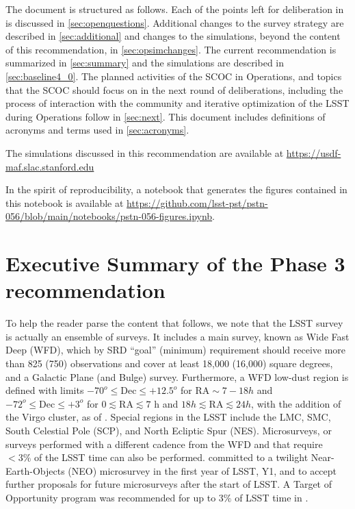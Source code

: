 The document is structured as follows.
Each of the points left for deliberation in   is discussed in \autoref{sec:openquestions}. 
Additional changes to the survey strategy are described in \autoref{sec:additional} and changes to the simulations, beyond the content of this recommendation, in \autoref{sec:opsimchanges}. 
The current recommendation is summarized in \autoref{sec:summary} and the  simulations are described in \autoref{sec:baseline4_0}.
The planned activities of the SCOC in Operations, and topics that the SCOC should focus on in the next round of deliberations, including the process of interaction with the community and iterative optimization of the LSST during Operations follow in \autoref{sec:next}.
This document includes definitions of acronyms and terms used in \autoref{sec:acronyms}.

The simulations discussed in this recommendation are available at \url{https://usdf-maf.slac.stanford.edu}

In the spirit of reproducibility, a notebook that generates the figures contained in this notebook is available at \url{https://github.com/lsst-pst/pstn-056/blob/main/notebooks/pstn-056-figures.ipynb}.

\clearpage

\section{Executive Summary of the Phase 3 recommendation}


To help the reader parse the content that follows, we note that the LSST survey is actually an ensemble of surveys. It includes a main survey, known as Wide Fast Deep (WFD), which by SRD ``goal'' (minimum) requirement should receive more than 825 (750) observations and cover at least 18,000 (16,000) square degrees, and a Galactic Plane (and Bulge) survey. Furthermore, a WFD low-dust region is defined with limits $-70^o \leq \mathrm{Dec} \leq +12.5^o$ for 
$\mathrm{RA} \sim   7-18 h$ and $-72^o \leq \mathrm{Dec}\leq +3^o$
for $0 \lesssim \mathrm{RA} \lesssim 7$ h and $18 h \lesssim \mathrm{RA} \lesssim 24 h$, with the addition of the Virgo cluster, as of .  Special regions in the LSST include the LMC, SMC, South Celestial Pole (SCP), and North Ecliptic Spur (NES). Microsurveys, or surveys performed with a different cadence from the WFD and that require $<3\%$ of the LSST time can also be performed.  committed to a twilight Near-Earth-Objects (NEO) microsurvey in the first year of LSST, Y1, and to accept further proposals for future microsurveys after the start of LSST. A Target of Opportunity program was recommended for up to $3\%$ of LSST time in .

